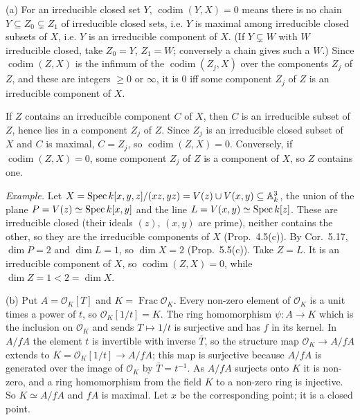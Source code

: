 \documentclass[11pt]{article}
\begin{document}
\pf
(a) For an irreducible closed set $Y$, $\operatorname{codim}(Y,X)=0$ means there is no chain $Y\subseteq Z_0\subsetneq Z_1$ of irreducible closed sets, i.e. $Y$ is maximal among irreducible closed subsets of $X$, i.e. $Y$ is an irreducible component of $X$. (If $Y\subsetneq W$ with $W$ irreducible closed, take $Z_0=Y$, $Z_1=W$; conversely a chain gives such a $W$.) Since $\operatorname{codim}(Z,X)$ is the infimum of the $\operatorname{codim}(Z_j,X)$ over the components $Z_j$ of $Z$, and these are integers $\ge0$ or $\infty$, it is $0$ iff some component $Z_j$ of $Z$ is an irreducible component of $X$.

If $Z$ contains an irreducible component $C$ of $X$, then $C$ is an irreducible subset of $Z$, hence lies in a component $Z_j$ of $Z$. Since $Z_j$ is an irreducible closed subset of $X$ and $C$ is maximal, $C=Z_j$, so $\operatorname{codim}(Z,X)=0$. Conversely, if $\operatorname{codim}(Z,X)=0$, some component $Z_j$ of $Z$ is a component of $X$, so $Z$ contains one.

\emph{Example.} Let $X=\operatorname{Spec} k[x,y,z]/(xz,yz)=V(z)\cup V(x,y)\subseteq\mathbb A^3_k$, the union of the plane $P=V(z)\simeq\operatorname{Spec} k[x,y]$ and the line $L=V(x,y)\simeq\operatorname{Spec} k[z]$. These are irreducible closed (their ideals $(z)$, $(x,y)$ are prime), neither contains the other, so they are the irreducible components of $X$ (Prop.~4.5(c)). By Cor.~5.17, $\dim P=2$ and $\dim L=1$, so $\dim X=2$ (Prop.~5.5(c)). Take $Z=L$. It is an irreducible component of $X$, so $\operatorname{codim}(Z,X)=0$, while $\dim Z=1<2=\dim X$.

(b) Put $A=\mathcal O_K[T]$ and $K=\operatorname{Frac}\mathcal O_K$. Every non-zero element of $\mathcal O_K$ is a unit times a power of $t$, so $\mathcal O_K[1/t]=K$. The ring homomorphism $\psi:A\to K$ which is the inclusion on $\mathcal O_K$ and sends $T\mapsto1/t$ is surjective and has $f$ in its kernel. In $A/fA$ the element $t$ is invertible with inverse $\bar T$, so the structure map $\mathcal O_K\to A/fA$ extends to $K=\mathcal O_K[1/t]\to A/fA$; this map is surjective because $A/fA$ is generated over the image of $\mathcal O_K$ by $\bar T=t^{-1}$. As $A/fA$ surjects onto $K$ it is non-zero, and a ring homomorphism from the field $K$ to a non-zero ring is injective. So $K\simeq A/fA$ and $fA$ is maximal. Let $x$ be the corresponding point; it is a closed point.
\end{document}
